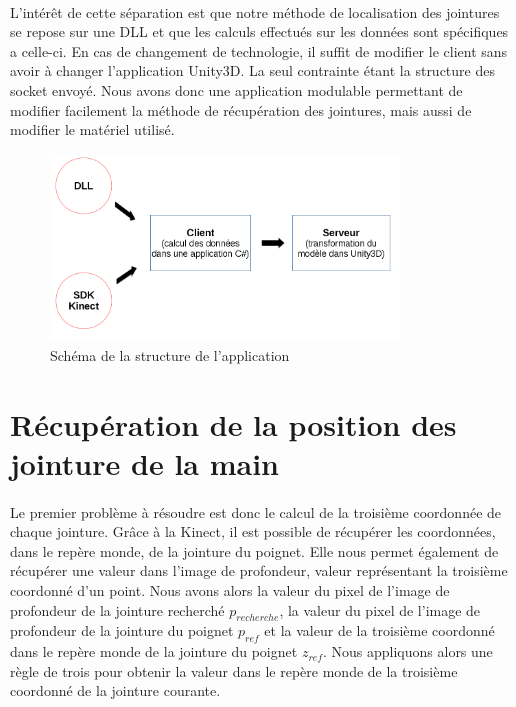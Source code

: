 \paragraph{}
L'intérêt de cette séparation est que notre méthode de localisation des jointures se repose sur une 
DLL et que les calculs effectués sur les données sont spécifiques a celle-ci. En cas de changement de 
technologie, il suffit de modifier le client sans avoir à changer l'application Unity3D. La seul contrainte
étant la structure des socket envoyé. Nous avons donc une application modulable permettant de modifier 
facilement la méthode de récupération des jointures, mais aussi de modifier le matériel utilisé.

\begin{figure}[H]
  \label{schema_application}
  \begin{center}
    \includegraphics[width=350px]{images/schemaAppli.png}
    \caption{Schéma de la structure de l'application}
  \end{center}
\end{figure}

\section{Récupération de la position des jointure de la main}
\paragraph{}
Le premier problème à résoudre est donc le calcul de la troisième coordonnée de chaque jointure. Grâce à la Kinect,
il est possible de récupérer les coordonnées, dans le repère monde, de la jointure du poignet. Elle nous permet
également de récupérer une valeur dans l'image de profondeur, valeur représentant la troisième coordonné d'un point.
Nous avons alors la valeur du pixel de l'image de profondeur de la jointure recherché $p_{recherche}$, la valeur
du pixel de l'image de profondeur de la jointure du poignet $p_{ref}$ et la valeur de la troisième coordonné dans 
le repère monde de la jointure du poignet $z_{ref}$. Nous appliquons alors une règle de trois pour obtenir 
la valeur dans le repère monde de la troisième coordonné de la jointure courante.

